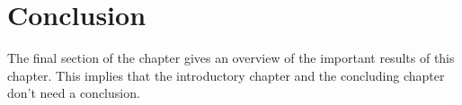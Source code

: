 \section{Conclusion}
The final section of the chapter gives an overview of the important results
of this chapter. This implies that the introductory chapter and the
concluding chapter don't need a conclusion.

\lipsum[66]

